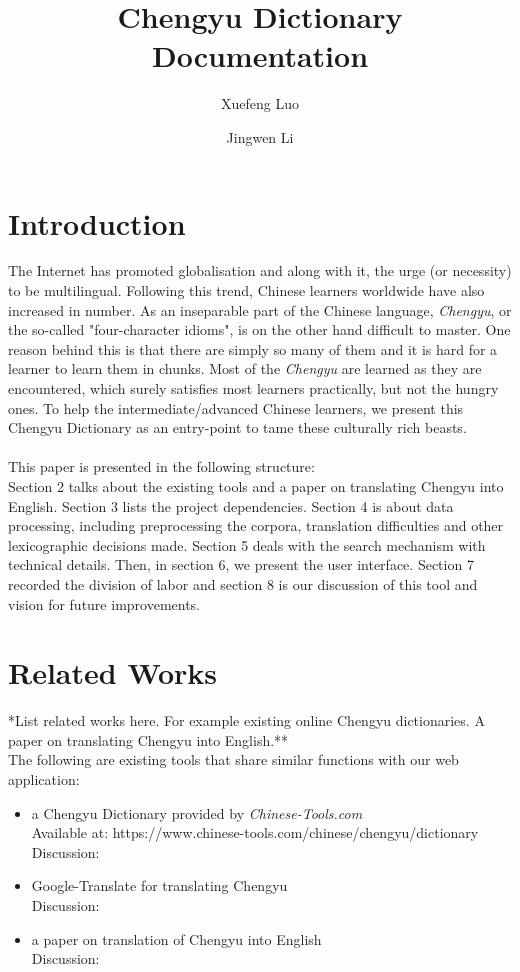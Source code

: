\documentclass[11pt]{article} %
\title{Chengyu Dictionary Documentation} %
\author{Xuefeng Luo \and Jingwen Li}
\date{}	%
\begin{document}
\maketitle

\section{Introduction}
\indent The Internet has promoted globalisation and along with it, the urge (or necessity) to be multilingual. Following this trend, Chinese learners worldwide have also increased in number. As an inseparable part of the Chinese language, \textit{Chengyu}, or the so-called "four-character idioms", is on the other hand difficult to master. One reason behind this is that there are simply so many of them and it is hard for a learner to learn them in chunks. Most of the \textit{Chengyu} are learned as they are encountered, which surely satisfies most learners practically, but not the hungry ones. To help the intermediate/advanced Chinese learners, we present this Chengyu Dictionary as an entry-point to tame these culturally rich beasts.\\
\\
\indent This paper is presented in the following structure:\\
Section 2 talks about the existing tools and a paper on translating Chengyu into English. Section 3 lists the project dependencies. Section 4 is about data processing, including preprocessing the corpora, translation difficulties and other lexicographic decisions made. Section 5 deals with the search mechanism with technical details. Then, in section 6, we present the user interface. Section 7 recorded the division of labor and section 8 is our discussion of this tool and vision for future improvements.

\section{Related Works}
\indent **List related works here. For example existing online Chengyu dictionaries. A paper on translating Chengyu into English.**\\
The following are existing tools that share similar functions with our web application:
\begin{itemize}
\item a Chengyu Dictionary provided by \textit{Chinese-Tools.com}\\
Available at: https://www.chinese-tools.com/chinese/chengyu/dictionary\\
Discussion:\\
\item Google-Translate for translating Chengyu\\
Discussion:\\
\item a paper on translation of Chengyu into English\\
Discussion:\\
\end{itemize}
\end{document}
